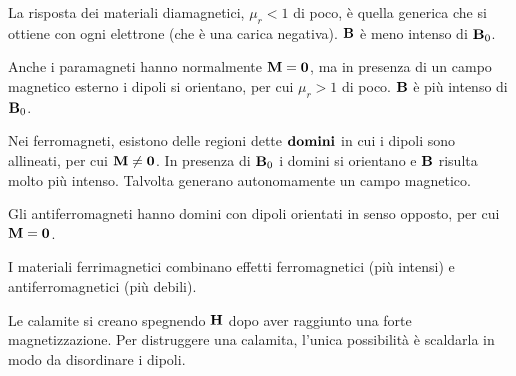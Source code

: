La risposta dei materiali diamagnetici, $\mu_r < 1$ di poco, è quella generica che si ottiene con ogni elettrone (che è una carica negativa).
$\mathbf{B}$ è meno intenso di $\mathbf{B}_0$.

Anche i paramagneti hanno normalmente $\mathbf{M} = \mathbf{0}$, ma in presenza di un campo magnetico esterno i dipoli si orientano, per cui $\mu_r > 1$ di poco.
$\mathbf{B}$ è più intenso di $\mathbf{B}_0$.

Nei ferromagneti, esistono delle regioni dette $\textbf{domini}$ in cui i dipoli sono allineati, per cui $\mathbf{M} \ne \mathbf{0}$.
In presenza di $\mathbf{B}_0$ i domini si orientano e $\mathbf{B}$ risulta molto più intenso.
Talvolta generano autonomamente un campo magnetico.

Gli antiferromagneti hanno domini con dipoli orientati in senso opposto, per cui $\mathbf{M} = \mathbf{0}$.

I materiali ferrimagnetici combinano effetti ferromagnetici (più intensi) e antiferromagnetici (più debili).

Le calamite si creano spegnendo $\mathbf{H}$ dopo aver raggiunto una forte magnetizzazione.
Per distruggere una calamita, l'unica possibilità è scaldarla in modo da disordinare i dipoli.

